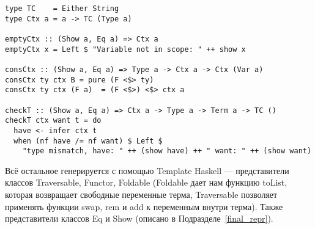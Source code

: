 \begin{lstlisting}[caption={Проверка типов и контексты},captionpos=b, frame=single, float,floatplacement=H, label={lst_checkT}]
type TC    = Either String
type Ctx a = a -> TC (Type a)

emptyCtx :: (Show a, Eq a) => Ctx a
emptyCtx x = Left $ "Variable not in scope: " ++ show x

consCtx :: (Show a, Eq a) => Type a -> Ctx a -> Ctx (Var a)
consCtx ty ctx B = pure (F <$> ty)
consCtx ty ctx (F a)  = (F <$>) <$> ctx a

checkT :: (Show a, Eq a) => Ctx a -> Type a -> Term a -> TC ()
checkT ctx want t = do
  have <- infer ctx t
  when (nf have /= nf want) $ Left $
    "type mismatch, have: " ++ (show have) ++ " want: " ++ (show want)
\end{lstlisting}

Всё остальное генерируется с помощью Template Haskell\cite{TH} --- представители классов Traversable\cite{deriveFun}, Functor, Foldable (Foldable дает нам функцию toList, которая возвращает свободные переменные терма, Traversable позволяет применять функции swap, rem и add к переменным внутри терма). Также представители классов Eq и Show (описано в Подразделе~\ref{final_repr}).


